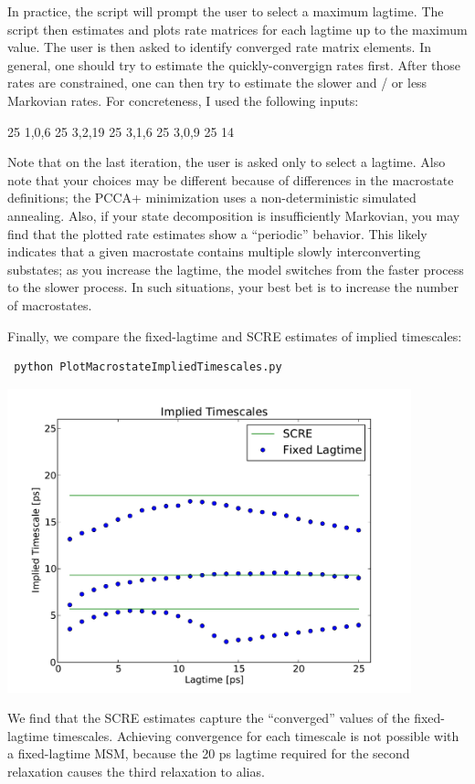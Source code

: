\documentclass[12pt]{article}
\begin{document}
In practice, the script will prompt the user to select a maximum lagtime.  The script then estimates and plots rate matrices for each lagtime up to the maximum value.  The user is then asked to identify converged rate matrix elements.  In general, one should try to estimate the quickly-convergign rates first.  After those rates are constrained, one can then try to estimate the slower and / or less Markovian rates.  For concreteness, I used the following inputs:

25
1,0,6
25
3,2,19
25
3,1,6
25
3,0,9
25
14

Note that on the last iteration, the user is asked only to select a lagtime.  Also note that your choices may be different because of differences in the macrostate definitions; the PCCA+ minimization uses a non-deterministic simulated annealing.  Also, if your state decomposition is insufficiently Markovian, you may find that the plotted rate estimates show a ``periodic'' behavior.  This likely indicates that a given macrostate contains multiple slowly interconverting substates; as you increase the lagtime, the model switches from the faster process to the slower process.  In such situations, your best bet is to increase the number of macrostates.  

Finally, we compare the fixed-lagtime and SCRE estimates of implied timescales:

\begin{verbatim}
 python PlotMacrostateImpliedTimescales.py
\end{verbatim}


\includegraphics[width=11.7cm]{figures/SCRE}


We find that the SCRE estimates capture the ``converged'' values of the fixed-lagtime timescales.  Achieving convergence for each timescale is not possible with a fixed-lagtime MSM, because the 20 ps lagtime required for the second relaxation causes the third relaxation to alias.  

\newpage




\end{document}
